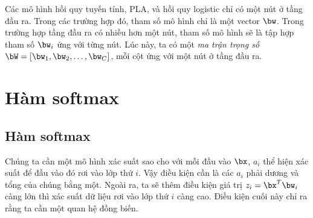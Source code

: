  

 
Các mô hình hồi quy tuyến tính, PLA, và hồi quy logistic chỉ có một nút ở tầng
đầu ra. Trong các trường hợp đó, tham số mô hình chỉ là một vector $\bw$.
Trong trường hợp tầng đầu ra có nhiều hơn một nút, tham số mô hình sẽ là tập hợp
tham số $\bw_i$ ứng với từng nút. Lúc này, ta có một \textit{ma trận
trọng số} $\bW = [\bw_1, \bw_2, \dots, \bw_C]$, mỗi
cột ứng với một nút ở tầng đầu ra.
 
 
\section{Hàm softmax}
\subsection{Hàm softmax}

Chúng ta cần một mô hình xác suất sao cho với mỗi đầu vào $\bx$, $a_i$ thể hiện
xác suất để đầu vào đó rơi vào lớp thứ $i$. Vậy điều kiện cần là các $a_i$ phải
dương và tổng của chúng bằng một. Ngoài ra, ta sẽ thêm điều kiện giá trị $z_i =
\bx^T\bw_i$ càng lớn thì xác suất dữ liệu rơi vào lớp thứ $i$ càng cao. Điều
kiện cuối này chỉ ra rằng ta cần một quan hệ đồng biến.
 
